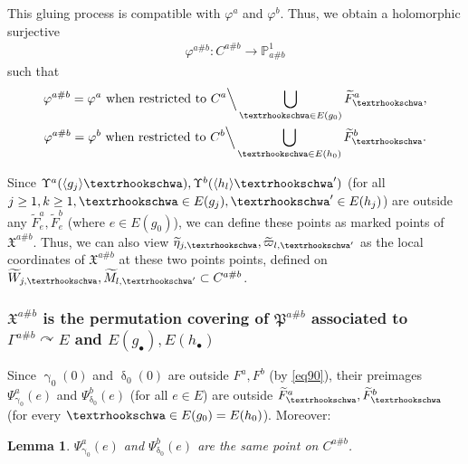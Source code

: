 \documentclass[11pt,b5paper,notitlepage]{article}
\theoremstyle{definition}
\theoremstyle{plain}
\newtheorem{lm}[df]{Lemma}
\newcommand{\fk}{\mathfrak}
\newcommand{\wtd}{\widetilde}
\newcommand{\bk}[1]{\langle {#1}\rangle}
\newcommand{\blt}{\bullet}
\newcommand{\Pbb}{\mathbb P}
\newcommand{\tipae}{\text{\textrhookschwa}}
\numberwithin{equation}{subsection}
\begin{document}
This gluing process is compatible with $\varphi^a$ and $\varphi^b$. Thus, we obtain a holomorphic surjective
\begin{align*}
\varphi^{a\#b}:C^{a\#b}\rightarrow \Pbb^1_{a\#b}	
\end{align*}
such that
\begin{gather*}
\varphi^{a\#b}=\varphi^a\text{ when restricted to }C^a\Big\backslash\bigcup_{\tipae\in E(g_0)}\wtd F_\tipae^a,	\\
\varphi^{a\#b}=\varphi^b\text{ when restricted to }C^b\Big\backslash\bigcup_{\tipae\in E(h_0)}\wtd F_\tipae^b.
\end{gather*}

Since $\Upsilon^a(\bk{g_j}\tipae),\Upsilon^b(\bk{h_l}\tipae')$ (for all $j\geq 1,k\geq 1,\tipae\in E(g_j),\tipae'\in E(h_j)$) are outside any $\wtd F^a_e,\wtd F^b_e$ (where $e\in E(g_0)$), we can define these points as marked points of $\fk X^{a\#b}$. Thus, we can also view $\wtd\eta_{j,\tipae},\wtd\varpi_{l,\tipae'}$ as the local coordinates of $\fk X^{a\#b}$ at these two points points, defined on $\wtd W_{j,\tipae},\wtd M_{l,\tipae'}\subset C^{a\#b}$.



\subsubsection[$\fk X^{a\#b}$ is the permutation covering of $\fk P^{a\#b}$]{$\fk X^{a\#b}$ is the permutation covering of $\fk P^{a\#b}$ associated to $\Gamma^{a\#b}\curvearrowright E$ and $E(g_\blt),E(h_\blt)$}


Since $\upgamma_0(0)$ and $\updelta_0(0)$ are outside $F^a,F^b$ (by \eqref{eq90}), their preimages $\Psi_{\upgamma_0}^a(e)$ and $\Psi_{\updelta_0}^b(e)$ (for all $e\in E$) are outside $\wtd F^a_\tipae,\wtd F^b_\tipae$ (for every $\tipae\in E(g_0)=E(h_0)$). Moreover:

\begin{lm}
$\Psi_{\upgamma_0}^a(e)$ and $\Psi_{\updelta_0}^b(e)$ are the same point on $C^{a\#b}$.
\end{lm}
\end{document}
